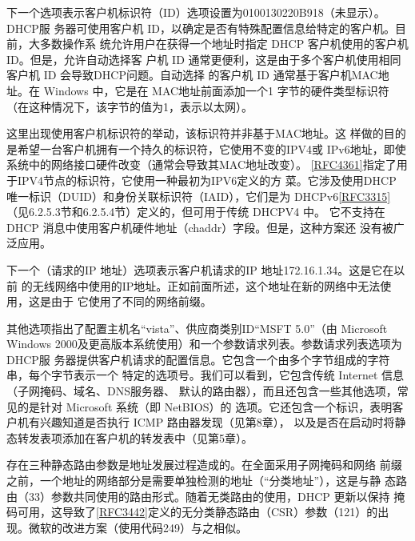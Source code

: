 下一个选项表示客户机标识符（ID）选项设置为0100130220B918（未显示）。DHCP服
务器可使用客户机 ID，以确定是否有特殊配置信息给特定的客户机。目前，大多数操作系
统允许用户在获得一个地址时指定 DHCP 客户机使用的客户机 ID。但是，允许自动选择客
户机 ID 通常更便利，这是由于多个客户机使用相同客户机 ID 会导致DHCP问题。自动选择
的客户机 ID 通常基于客户机MAC地址。在 Windows 中，它是在 MAC地址前面添加一个1
字节的硬件类型标识符（在这种情况下，该字节的值为1，表示以太网）。

\begin{tcolorbox}
  这里出现使用客户机标识符的举动，该标识符并非基于MAC地址。这
  样做的目的是希望一台客户机拥有一个持久的标识符，它使用不变的IPV4或
  IPv6地址，即使系统中的网络接口硬件改变（通常会导致其MAC地址改变）。
  \href{https://www.rfc-editor.org/rfc/rfc4361}{\href{https://www.rfc-editor.org/rfc/rfc4361}{[RFC4361]}}指定了用于IPV4节点的标识符，它使用一种最初为IPV6定义的方
  菜。它涉及使用DHCP 唯一标识（DUID）和身份关联标识符（IAID），它们是为
  DHCPv6\href{https://www.rfc-editor.org/rfc/rfc3315}{\href{https://www.rfc-editor.org/rfc/rfc3315}{[RFC3315]}}（见6.2.5.3节和6.2.5.4节）定义的，但可用于传统
  DHCPV4 中。
  它不支持在 DHCP 消息中使用客户机硬件地址（chaddr）字段。但是，这种方案还
  没有被广泛应用。
\end{tcolorbox}

下一个（请求的IP 地址）选项表示客户机请求的IP 地址172.16.1.34。这是它在以前
的无线网络中使用的IP地址。正如前面所述，这个地址在新的网络中无法使用，这是由于
它使用了不同的网络前缀。

其他选项指出了配置主机名“vista”、供应商类别ID“MSFT 5.0”（由 Microsoft
Windows 2000及更高版本系统使用）和一个参数请求列表。参数请求列表选项为DHCP服
务器提供客户机请求的配置信息。它包含一个由多个字节组成的字符串，每个字节表示一个
特定的选项号。我们可以看到，它包含传统 Internet 信息（子网掩码、域名、DNS服务器、
默认的路由器），而且还包含一些其他选项，常见的是针对 Microsoft 系统（即 NetBIOS）的
选项。它还包含一个标识，表明客户机有兴趣知道是否执行 ICMP 路由器发现（见第8章），
以及是否在启动时将静态转发表项添加在客户机的转发表中（见第5章）。

\begin{tcolorbox}
  存在三种静态路由参数是地址发展过程造成的。在全面采用子网掩码和网络
  前缀之前，一个地址的网络部分是需要单独检测的地址（“分类地址”），这是与静
  态路由（33）参数共同使用的路由形式。随着无类路由的使用，DHCP 更新以保持
  掩码可用，这导致了\href{https://www.rfc-editor.org/rfc/rfc3442}{\href{https://www.rfc-editor.org/rfc/rfc3442}{[RFC3442]}}定义的无分类静态路由（CSR）参数（121）的出
  现。微软的改进方案（使用代码249）与之相似。
\end{tcolorbox}

